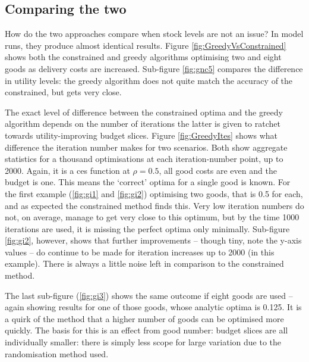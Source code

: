 \subsection{Comparing the two}

How do the two approaches compare when stock levels are not an issue? In model runs, they produce almost identical results. Figure \ref{fig:GreedyVsConstrained} shows both the constrained and greedy algorithms optimising two and eight goods as delivery costs are increased. Sub-figure \ref{fig:gnc5} compares the difference in utility levels: the greedy algorithm does not quite match the accuracy of the constrained, but gets very close.

The exact level of difference between the constrained optima and the greedy algorithm depends on the number of iterations the latter is given to ratchet towards utility-improving budget slices. Figure \ref{fig:GreedyItes} shows what difference the iteration number makes for two scenarios. Both show aggregate statistics for a thousand optimisations at each iteration-number point, up to 2000. Again, it is a \gls{ces} function at $\rho=0.5$, all good costs are even and the budget is one. This means the `correct’ optima for a single good is known. For the first example (\ref{fig:gi1} and \ref{fig:gi2}) optimising two goods, that is 0.5 for each, and as expected the constrained method finds this. Very low iteration numbers do not, on average, manage to get very close to this optimum, but by the time 1000 iterations are used, it is missing the perfect optima only minimally. Sub-figure \ref{fig:gi2}, however, shows that further improvements – though tiny, note the y-axis values – do continue to be made for iteration increases up to 2000 (in this example). There is always a little noise left in comparison to the constrained method.

The last sub-figure (\ref{fig:gi3}) shows the same outcome if eight goods are used – again showing results for one of those goods, whose analytic optima is 0.125. It is a quirk of the method that a higher number of goods can be optimised more quickly. The basis for this is an effect from good number: budget slices are all individually smaller: there is simply less scope for large variation due to the randomisation method used.

